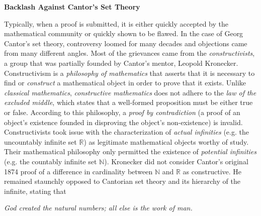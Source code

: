 \begin{tcolorbox}[breakable, enhanced, colback=textbook-blue, sharp corners]
	\vspace{3mm}
	\begin{center}
		\textbf{Backlash Against Cantor's Set Theory}
	\end{center}
	Typically, when a proof is submitted, it is either quickly accepted by the mathematical community or quickly shown to be flawed. In the case of Georg Cantor's set theory, controversy loomed for many decades and objections came from many different angles. Most of the grievances came from the \textit{constructivists}, a group that was partially founded by Cantor's mentor, Leopold Kronecker. \\
	
	Constructivism is a \textit{philosophy of mathematics} that asserts that it is necessary to find or \textit{construct} a mathematical object in order to prove that it exists. Unlike \textit{classical mathematics}, \textit{constructive mathematics} does not adhere to the \textit{law of the excluded middle}, which states that a well-formed proposition must be either true or false. According to this philosophy, a \textit{proof by contradiction} (a proof of an object's existence founded in disproving the object's non-existence) is invalid. Constructivists took issue with the characterization of \textit{actual infinities} (e.g. the uncountably infinite set $\mathbb{R}$) as legitimate mathematical objects worthy of study. Their mathematical philosophy only permitted the existence of \textit{potential infinities} (e.g. the countably infinite set $\mathbb{N}$). Kronecker did not consider Cantor's original 1874 proof of a difference in cardinality between $\mathbb{N}$ and $\mathbb{R}$ as constructive. He remained staunchly opposed to Cantorian set theory and its hierarchy of the infinite, stating that \\
	
	\begin{center}
		\begin{displayquote}
			\centering
			\textit{God created the natural numbers; all else is the work of man.}
			\vspace{4mm}
		\end{displayquote}
	\end{center}


\end{tcolorbox}
